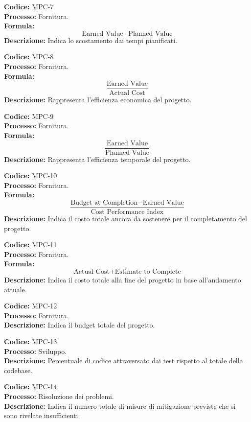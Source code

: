\textbf{Codice:} MPC-7 \\
\textbf{Processo:} Fornitura. \\
\textbf{Formula:}
\[
\text{Earned Value} - \text{Planned Value}
\]
\textbf{Descrizione:} Indica lo scostamento dai tempi pianificati.

\textbf{Codice:} MPC-8 \\
\textbf{Processo:} Fornitura. \\
\textbf{Formula:}
\[
\frac{\text{Earned Value}}{\text{Actual Cost}}
\]
\textbf{Descrizione:} Rappresenta l’efficienza economica del progetto.

\textbf{Codice:} MPC-9 \\
\textbf{Processo:} Fornitura. \\
\textbf{Formula:}
\[
\frac{\text{Earned Value}}{\text{Planned Value}}
\]
\textbf{Descrizione:} Rappresenta l’efficienza temporale del progetto.

\textbf{Codice:} MPC-10 \\
\textbf{Processo:} Fornitura. \\
\textbf{Formula:}
\[
\frac{\text{Budget at Completion} - \text{Earned Value}}{\text{Cost Performance Index}}
\]
\textbf{Descrizione:} Indica il costo totale ancora da sostenere per il completamento del progetto.

\textbf{Codice:} MPC-11 \\
\textbf{Processo:} Fornitura. \\
\textbf{Formula:}
\[
\text{Actual Cost} + \text{Estimate to Complete}
\]
\textbf{Descrizione:} Indica il costo totale alla fine del progetto in base all’andamento attuale.

\textbf{Codice:} MPC-12 \\
\textbf{Processo:} Fornitura. \\
\textbf{Descrizione:} Indica il budget totale del progetto.

\textbf{Codice:} MPC-13 \\
\textbf{Processo:} Sviluppo. \\
\textbf{Descrizione:} Percentuale di codice attraversato dai test rispetto al totale della codebase.

\textbf{Codice:} MPC-14 \\
\textbf{Processo:} Risoluzione dei problemi. \\
\textbf{Descrizione:} Indica il numero totale di misure di mitigazione previste che si sono rivelate insufficienti.

